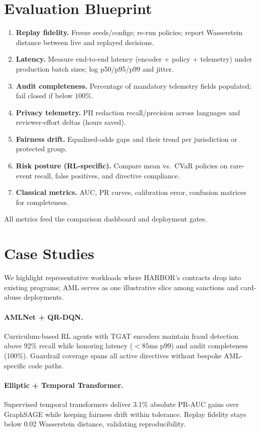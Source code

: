 \documentclass[letterpaper]{article}
\begin{document}
\section{Evaluation Blueprint}
\label{sec:evaluation}
\begin{enumerate}
    \item \textbf{Replay fidelity.} Freeze seeds/configs; re-run policies; report Wasserstein distance between live and replayed decisions.
    \item \textbf{Latency.} Measure end-to-end latency (encoder + policy + telemetry) under production batch sizes; log p50/p95/p99 and jitter.
    \item \textbf{Audit completeness.} Percentage of mandatory telemetry fields populated; fail closed if below $100\%$.
    \item \textbf{Privacy telemetry.} PII redaction recall/precision across languages and reviewer-effort deltas (hours saved).
    \item \textbf{Fairness drift.} Equalized-odds gaps and their trend per jurisdiction or protected group.
    \item \textbf{Risk posture (RL-specific).} Compare mean vs.\ CVaR policies on rare-event recall, false positives, and directive compliance.
    \item \textbf{Classical metrics.} AUC, PR curves, calibration error, confusion matrices for completeness.
\end{enumerate}
All metrics feed the comparison dashboard and deployment gates.

\section{Case Studies}
We highlight representative workloads where \textsc{HARBOR}'s contracts drop into existing programs; AML serves as one illustrative slice among sanctions and card-abuse deployments.
\paragraph{AMLNet + QR-DQN.} Curriculum-based RL agents with TGAT encoders maintain fraud detection above 92\% recall while honoring latency ($<85$ms p99) and audit completeness (100\%). Guardrail coverage spans all active directives without bespoke AML-specific code paths.
\paragraph{Elliptic + Temporal Transformer.} Supervised temporal transformers deliver 3.1\% absolute PR-AUC gains over GraphSAGE while keeping fairness drift within tolerance. Replay fidelity stays below 0.02 Wasserstein distance, validating reproducibility.
\end{document}
